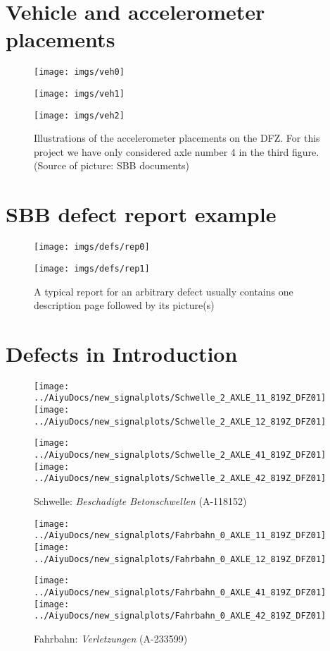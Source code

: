 \section{Vehicle and accelerometer placements}
\label{figs:veh}
\begin{figure}[H]
	\centering
	\texttt{[image: imgs/veh0]}
	\label{fig:veh0}
	
	\texttt{[image: imgs/veh1]}
	\label{fig:veh1}
	
	\texttt{[image: imgs/veh2]}
	\caption{Illustrations of the accelerometer placements on the DFZ. For this project we have only considered axle number 4 in the third figure. (Source of picture: SBB documents)}
	\label{fig:veh2}
\end{figure}

\section{SBB defect report example}
\label{app:report}
\begin{figure}[H]
	\centering
	\texttt{[image: imgs/defs/rep0]}
	\caption{}
	\texttt{[image: imgs/defs/rep1]}
	\caption{A typical report for an arbitrary defect usually contains one description page followed by its picture(s)}
	\label{fig:veh2}
\end{figure}

\section{Defects in Introduction}
\label{app:introdefects}
\begin{figure}[H]
	\centering
	\texttt{[image: ../AiyuDocs/new\_signalplots/Schwelle\_2\_AXLE\_11\_819Z\_DFZ01]}
	\texttt{[image: ../AiyuDocs/new\_signalplots/Schwelle\_2\_AXLE\_12\_819Z\_DFZ01]}
	
	\texttt{[image: ../AiyuDocs/new\_signalplots/Schwelle\_2\_AXLE\_41\_819Z\_DFZ01]}
	\texttt{[image: ../AiyuDocs/new\_signalplots/Schwelle\_2\_AXLE\_42\_819Z\_DFZ01]}
	\caption{Schwelle: \textit{Beschadigte Betonschwellen} (A-118152)}
\end{figure}

\begin{figure}[H]
	\centering
	\texttt{[image: ../AiyuDocs/new\_signalplots/Fahrbahn\_0\_AXLE\_11\_819Z\_DFZ01]}
	\texttt{[image: ../AiyuDocs/new\_signalplots/Fahrbahn\_0\_AXLE\_12\_819Z\_DFZ01]}
	
	\texttt{[image: ../AiyuDocs/new\_signalplots/Fahrbahn\_0\_AXLE\_41\_819Z\_DFZ01]}
	\texttt{[image: ../AiyuDocs/new\_signalplots/Fahrbahn\_0\_AXLE\_42\_819Z\_DFZ01]}
	\caption{Fahrbahn: \textit{Verletzungen} (A-233599)}
\end{figure}

